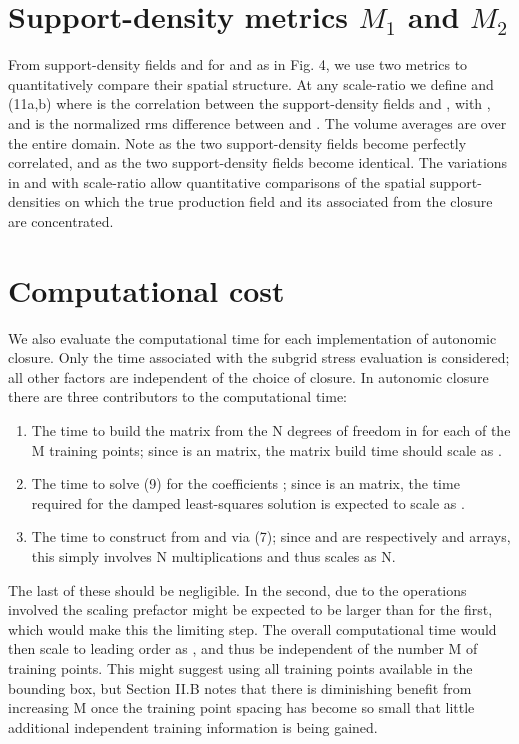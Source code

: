 \section{Support-density metrics  $M_1$ and $M_2$ }

From support-density fields   and   for   and   as in Fig. 4, we use two metrics to quantitatively compare their spatial structure. At any scale-ratio   we define
       and              (11a,b)
where   is the correlation between the support-density fields   and  , with  , and   is the normalized rms difference between   and  . The volume averages are over the entire domain. Note   as the two support-density fields become perfectly correlated, and   as the two support-density fields become identical. The variations in   and   with scale-ratio   allow quantitative comparisons of the spatial support-densities on which the true production field   and its associated   from the   closure are concentrated. 

\section{Computational cost}

We also evaluate the computational time for each implementation of autonomic closure. Only the time associated with the subgrid stress evaluation is considered; all other factors are independent of the choice of closure. In autonomic closure there are three contributors to the computational time:  
%
\begin{enumerate} 
	\item{The time to build the   matrix from the N degrees of freedom in   for each of the M training points; since   is an   matrix, the matrix build time should scale as  .}
	\item{The time to solve (9) for the coefficients  ; since   is an   matrix, the time required for the damped least-squares solution is expected to scale as  .}
	\item{The time to construct   from   and   via (7); since   and   are respectively   and   arrays, this simply involves N multiplications and thus scales as N.}
\end{enumerate}
%
%
The last of these should be negligible. In the second, due to the operations involved the scaling prefactor might be expected to be larger than for the first, which would make this the limiting step. The overall computational time would then scale to leading order as  , and thus be independent of the number M of training points. This might suggest using all training points available in the bounding box, but Section II.B notes that there is diminishing benefit from increasing M once the training point spacing   has become so small that little additional independent training information is being gained.  

